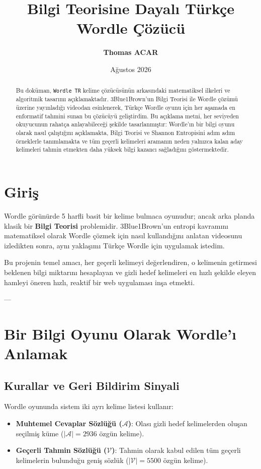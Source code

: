 \documentclass[11pt,a4paper]{article}
\title{\textbf{Bilgi Teorisine Dayalı Türkçe Wordle Çözücü}}
\author{\textbf{Thomas ACAR}}
\date{Ağustos 2026}
\begin{document}
\maketitle

\begin{abstract}
Bu doküman, \texttt{Wordle TR} kelime çözücüsünün arkasındaki matematiksel ilkeleri ve algoritmik tasarımı açıklamaktadır. 3Blue1Brown'un Bilgi Teorisi ile Wordle çözümü üzerine yayınladığı videodan esinlenerek, Türkçe Wordle oyunu için her aşamada en enformatif tahmini sunan bu çözücüyü geliştirdim. Bu açıklama metni, her seviyeden okuyucunun rahatça anlayabileceği şekilde tasarlanmıştır: Wordle'ın bir bilgi oyunu olarak nasıl çalıştığını açıklamakta, Bilgi Teorisi ve Shannon Entropisini adım adım örneklerle tanımlamakta ve tüm geçerli kelimeleri aramanın neden yalnızca kalan aday kelimeleri tahmin etmekten daha yüksek bilgi kazancı sağladığını göstermektedir.
\end{abstract}

\section{Giriş}
Wordle görünürde 5 harfli basit bir kelime bulmaca oyunudur; ancak arka planda klasik bir \textbf{Bilgi Teorisi} problemidir. 3Blue1Brown'un entropi kavramını matematiksel olarak Wordle çözmek için nasıl kullandığını anlatan videosunu izledikten sonra, aynı yaklaşımı Türkçe Wordle için uygulamak istedim.

Bu projenin temel amacı, her geçerli kelimeyi değerlendiren, o kelimenin getirmesi beklenen bilgi miktarını hesaplayan ve gizli hedef kelimeleri en hızlı şekilde eleyen hamleyi öneren hızlı, reaktif bir web uygulaması inşa etmekti.

---

\section{Bir Bilgi Oyunu Olarak Wordle'ı Anlamak}

\subsection{Kurallar ve Geri Bildirim Sinyali}
Wordle oyununda sistem iki ayrı kelime listesi kullanır:
\begin{itemize}[itemsep=2pt]
    \item \textbf{Muhtemel Cevaplar Sözlüğü ($\mathcal{A}$)}: Olası gizli hedef kelimelerden oluşan seçilmiş küme ($|\mathcal{A}| = 2936$ özgün kelime).
    \item \textbf{Geçerli Tahmin Sözlüğü ($\mathcal{V}$)}: Tahmin olarak kabul edilen tüm geçerli kelimelerin bulunduğu geniş sözlük ($|\mathcal{V}| = 5500$ özgün kelime).
\end{itemize}
\end{document}
